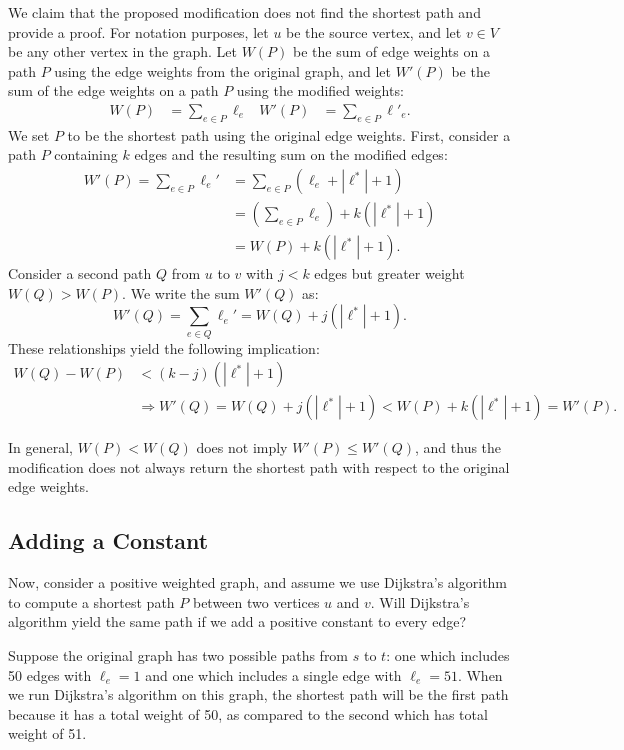 \documentclass[11pt]{article}
\begin{document}
We claim that the proposed modification does not find the shortest path and provide a proof. For notation purposes, let $u$ be the source vertex, and let $v \in V$ be any other vertex in the graph. Let $W(P)$ be the sum of edge weights on a path $P$ using the edge weights from the original graph, and let $W'(P)$ be the sum of the edge weights on a path $P$ using the modified weights:
\begin{align*}
    W(P) &= \sum_{e \in P} \ell_e & W'(P) &= \sum_{e \in P} \ell'_e.
\end{align*}
We set $P$ to be the shortest path using the original edge weights. First, consider a path $P$ containing $k$ edges and the resulting sum on the modified edges:
\begin{align*}
    W'(P) = \sum_{e \in P} \ell_e' &= \sum_{e \in P} (\ell_e + |\ell^*| + 1) \\ 
    &= \left(\sum_{e \in P} \ell_e \right) + k(|\ell^*| + 1) \\ 
    &= W(P) + k(|\ell^*| + 1).
\end{align*} 
Consider a second path $Q$ from $u$ to $v$ with $j < k$ edges but greater weight $W(Q) > W(P)$. We write the sum $W'(Q)$ as:
\begin{equation*}
    W'(Q) = \sum_{e \in Q} \ell_e' = W(Q) + j(|\ell^*| + 1). 
\end{equation*} 
These relationships yield the following implication:
\begin{align*}
    W(Q) - W(P) &< (k-j) (|\ell^*| + 1) \\ &\Longrightarrow W'(Q) = W(Q) + j(|\ell^*| + 1) < W(P) + k(|\ell^*| + 1) = W'(P).
\end{align*}

In general, $W(P) < W(Q)$ does not imply $W'(P) \leq W'(Q)$, and thus the modification does not always return the shortest path with respect to the original edge weights. 

\subsection{Adding a Constant}
Now, consider a positive weighted graph, and assume we use Dijkstra's algorithm to compute a shortest path $P$ between two vertices $u$ and $v$. Will Dijkstra's algorithm yield the same path if we add a positive constant to every edge?

Suppose the original graph has two possible paths from $s$ to $t$: one which includes 50 edges with $\ell_e = 1$ and one which includes a single edge with $\ell_e = 51$. When we run Dijkstra's algorithm on this graph, the shortest path will be the first path because it has a total weight of 50, as compared to the second which has total weight of 51. 
\end{document}
